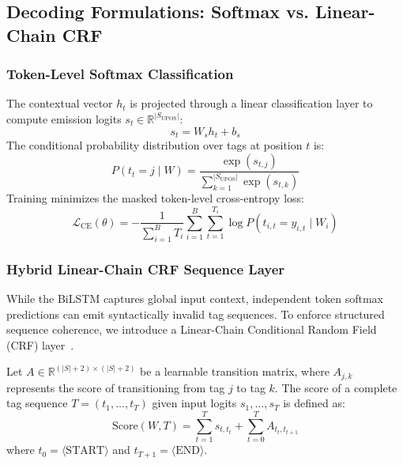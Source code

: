 \documentclass[conference]{IEEEtran}
\begin{document}
\subsection{Decoding Formulations: Softmax vs. Linear-Chain CRF}

\subsubsection{Token-Level Softmax Classification}
The contextual vector $h_t$ is projected through a linear classification layer to compute emission logits $s_t \in \mathbb{R}^{|S_{\text{UPOS}}|}$:
\begin{equation}
s_t = W_s h_t + b_s
\end{equation}
The conditional probability distribution over tags at position $t$ is:
\begin{equation}
P(t_t = j \mid W) = \frac{\exp(s_{t, j})}{\sum_{k=1}^{|S_{\text{UPOS}}|} \exp(s_{t, k})}
\end{equation}
Training minimizes the masked token-level cross-entropy loss:
\begin{equation}
\mathcal{L}_{\text{CE}}(\theta) = -\frac{1}{\sum_{i=1}^B T_i} \sum_{i=1}^B \sum_{t=1}^{T_i} \log P(t_{i, t} = y_{i, t} \mid W_i)
\end{equation}

\subsubsection{Hybrid Linear-Chain CRF Sequence Layer}
While the BiLSTM captures global input context, independent token softmax predictions can emit syntactically invalid tag sequences. To enforce structured sequence coherence, we introduce a Linear-Chain Conditional Random Field (CRF) layer~\cite{huang2015bidirectional, ma2016end}.

Let $A \in \mathbb{R}^{(|S|+2) \times (|S|+2)}$ be a learnable transition matrix, where $A_{j, k}$ represents the score of transitioning from tag $j$ to tag $k$. The score of a complete tag sequence $T = (t_1, \dots, t_T)$ given input logits $s_1, \dots, s_T$ is defined as:
\begin{equation}
\text{Score}(W, T) = \sum_{t=1}^T s_{t, t_t} + \sum_{t=0}^T A_{t_t, t_{t+1}}
\end{equation}
where $t_0 = \langle\text{START}\rangle$ and $t_{T+1} = \langle\text{END}\rangle$.
\end{document}
